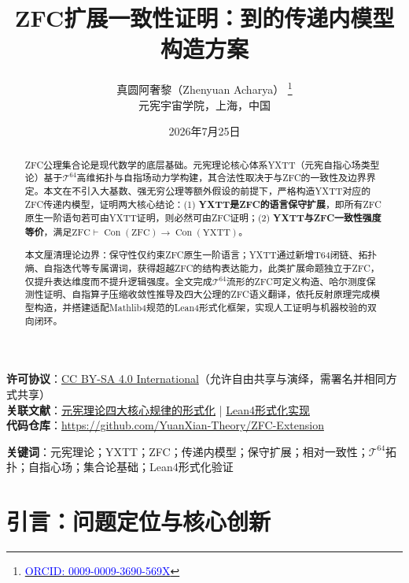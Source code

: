 \documentclass[12pt,a4paper]{article}
\theoremstyle{plain}
\theoremstyle{definition}
\newcommand{\T}{\mathcal{T}}
\newcommand{\Tsixtyfour}{\mathcal{T}^{64}}
\newcommand{\YXTT}{\mathrm{YXTT}}
\newcommand{\ZFC}{\mathrm{ZFC}}
\newcommand{\Con}{\operatorname{Con}}
\begin{document}
\title{ZFC扩展一致性证明：\YXTT{}到\ZFC{}的传递内模型构造方案}
\author{真圆阿奢黎（Zhenyuan Acharya）
\thanks{\href{https://orcid.org/0009-0009-3690-569X}{\textcolor{blue}{ORCID: 0009-0009-3690-569X}}} \\
元宪宇宙学院，上海，中国}
\date{2026年7月25日}

\maketitle

\begin{center}
\footnotesize
\textbf{许可协议}：\href{https://creativecommons.org/licenses/by-sa/4.0/}{CC BY-SA 4.0 International}（允许自由共享与演绎，需署名并相同方式共享）\\
\textbf{关联文献}：\href{https://zenodo.org/record/19657426}{元宪理论四大核心规律的形式化} | \href{https://zenodo.org/record/19719792}{Lean4形式化实现}\\
\textbf{代码仓库}：\url{https://github.com/YuanXian-Theory/ZFC-Extension}
\end{center}
\vspace{0.5em}
 
\begin{abstract}
ZFC公理集合论是现代数学的底层基础。元宪理论核心体系YXTT（元宪自指心场类型论）基于$\Tsixtyfour$高维拓扑与自指场动力学构建，其合法性取决于与ZFC的一致性及边界界定。本文在不引入大基数、强无穷公理等额外假设的前提下，严格构造YXTT对应的ZFC传递内模型，证明两大核心结论：(1) \textbf{YXTT是ZFC的语言保守扩展}，即所有ZFC原生一阶语句若可由YXTT证明，则必然可由ZFC证明；(2) \textbf{YXTT与ZFC一致性强度等价}，满足$\ZFC \vdash \Con(\ZFC) \to \Con(\YXTT)$。
 
本文厘清理论边界：保守性仅约束ZFC原生一阶语言；YXTT通过新增T64闭链、拓扑熵、自指迭代等专属谓词，获得超越ZFC的结构表达能力，此类扩展命题独立于ZFC，仅提升表达维度而不提升逻辑强度。全文完成$\Tsixtyfour$流形的ZFC可定义构造、哈尔测度保测性证明、自指算子压缩收敛性推导及四大公理的ZFC语义翻译，依托反射原理完成模型构造，并搭建适配Mathlib4规范的Lean4形式化框架，实现人工证明与机器校验的双向闭环。
\end{abstract}
 
\textbf{关键词}：元宪理论；YXTT；ZFC；传递内模型；保守扩展；相对一致性；$\T^{64}$拓扑；自指心场；集合论基础；Lean4形式化验证
 
\section{引言：问题定位与核心创新}
\label{sec:introduction}
 
\end{document}
